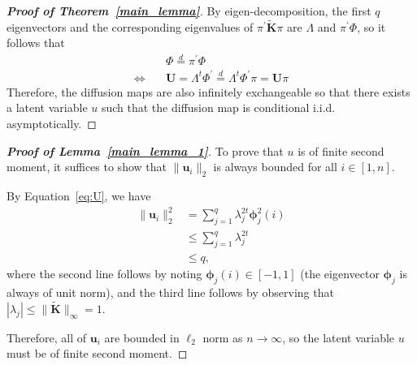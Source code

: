 \documentclass[12pt]{article}
\theoremstyle{definition}
\begin{document}
\begin{proof}[\textbf{Proof of Theorem~\ref{main_lemma}}]
		By eigen-decomposition, the first $q$ eigenvectors and the corresponding eigenvalues of $\pi^{'} \mathbf{\widetilde{K}} \pi$ are $\Lambda$ and $\pi^{'} \Phi$, so it follows that
		\begin{align*}
			& \Phi \stackrel{d}{=} \pi^{'} \Phi\\
			\Leftrightarrow \quad
			& \mathbf{U}=\Lambda^{t} \Phi^{'}  \stackrel{d}{=} \Lambda^{t} \Phi^{'} \pi = \mathbf{U} \pi 
		\end{align*}	
		Therefore, the diffusion maps are also infinitely exchangeable so that there exists a latent variable $u$ such that the diffusion map is conditional i.i.d. asymptotically. 
	\end{proof}
	
	\begin{proof}[\textbf{Proof of Lemma~\ref{main_lemma_1}}]
		To prove that $u$ is of finite second moment, it suffices to show that $\|\mathbf{u}_{i}\|_{2}$ is always bounded for all $i \in [1,n]$.
		
		By Equation~\ref{eq:U}, we have 
		\begin{align*}
			\| \mathbf{u}_i \|_{2}^{2}  &= \sum_{j=1}^{q} \lambda^{2t}_{j}\mathbf{\phi}_{j}^{2}(i) \\ 
			& \leq \sum_{j=1}^{q} \lambda^{2t}_{j} \\
			& \leq q,
		\end{align*}
		where the second line follows by noting $\mathbf{\phi}_{j}(i) \in [-1,1]$ (the eigenvector $\mathbf{\phi}_{j}$ is always of unit norm), and the third line follows by observing that $| \lambda_{j}| \leq \|\widetilde{\mathbf{K}}\|_{\infty}= 1$.
		
		Therefore, all of $\mathbf{u}_{i}$ are bounded in $\ell_{2}$ norm as $n \rightarrow \infty$, so the latent variable $u$ must be of finite second moment.
	\end{proof}
	
\end{document}
